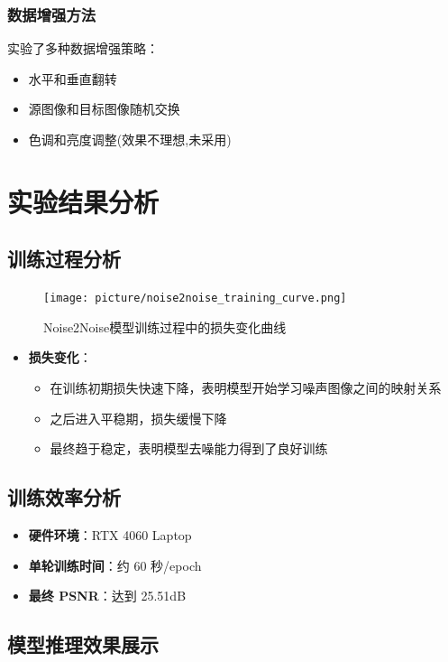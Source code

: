 \documentclass[UTF8]{ctexart}
\begin{document}
\subsubsection{数据增强方法}
实验了多种数据增强策略：
\begin{itemize}
    \item 水平和垂直翻转
    \item 源图像和目标图像随机交换
    \item 色调和亮度调整(效果不理想,未采用)
\end{itemize}

\section{实验结果分析}

\subsection{训练过程分析}
\begin{figure}[htbp]
    \centering
    \texttt{[image: picture/noise2noise\_training\_curve.png]}
    \caption{Noise2Noise模型训练过程中的损失变化曲线}
    \label{fig:training_curve}
\end{figure}

\begin{itemize}
    \item \textbf{损失变化}：
    \begin{itemize}
        \item 在训练初期损失快速下降，表明模型开始学习噪声图像之间的映射关系
        \item 之后进入平稳期，损失缓慢下降
        \item 最终趋于稳定，表明模型去噪能力得到了良好训练
    \end{itemize}
\end{itemize}

\subsection{训练效率分析}
\begin{itemize}
    \item \textbf{硬件环境}：RTX 4060 Laptop
    \item \textbf{单轮训练时间}：约 60 秒/epoch
    \item \textbf{最终 PSNR}：达到 25.51dB
\end{itemize}

\subsection{模型推理效果展示}
\end{document}

